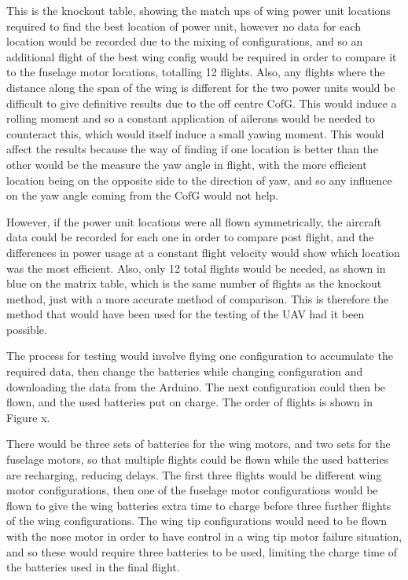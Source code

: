 \documentclass[../../main.tex]{subfiles}
\begin{document}

This is the knockout table, showing the match ups of wing power unit locations required to find the best location of power unit, however no data for each location would be recorded due to the mixing of configurations, and so an additional flight of the best wing config would be required in order to compare it to the fuselage motor locations, totalling 12 flights.
Also, any flights where the distance along the span of the wing is different for the two power units would be difficult to give definitive results due to the off centre CofG.
This would induce a rolling moment and so a constant application of ailerons would be needed to counteract this, which would itself induce a small yawing moment.
This would affect the results because the way of finding if one location is better than the other would be the measure the yaw angle in flight, with the more efficient location being on the opposite side to the direction of yaw, and so any influence on the yaw angle coming from the CofG would not help. 

However, if the power unit locations were all flown symmetrically, the aircraft data could be recorded for each one in order to compare post flight, and the differences in power usage at a constant flight velocity would show which location was the most efficient.
Also, only 12 total flights would be needed, as shown in blue on the matrix table, which is the same number of flights as the knockout method, just with a more accurate method of comparison.
This is therefore the method that would have been used for the testing of the UAV had it been possible.  

The process for testing would involve flying one configuration to accumulate the required data, then change the batteries while changing configuration and downloading the data from the Arduino.
The next configuration could then be flown, and the used batteries put on charge.
The order of flights is shown in Figure x. 


There would be three sets of batteries for the wing motors, and two sets for the fuselage motors, so that multiple flights could be flown while the used batteries are recharging, reducing delays.
The first three flights would be different wing motor configurations, then one of the fuselage motor configurations would be flown to give the wing batteries extra time to charge before three further flights of the wing configurations.
The wing tip configurations would need to be flown with the nose motor in order to have control in a wing tip motor failure situation, and so these would require three batteries to be used, limiting the charge time of the batteries used in the final flight.
\end{document}
